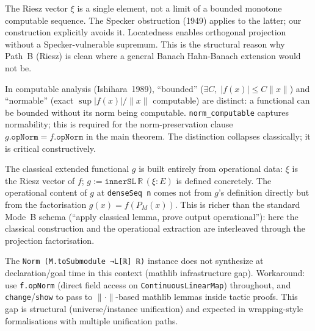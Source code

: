 \begin{remark}
\label{rem:audit_obs4}
\leanok
{}
The Riesz vector $\xi$ is a single element, not a limit of a bounded
monotone computable sequence.  The Specker obstruction (1949) applies to
the latter; our construction explicitly avoids it.  Locatedness enables
orthogonal projection without a Specker-vulnerable supremum.  This is the
structural reason why Path~B (Riesz) is clean where a general Banach
Hahn-Banach extension would not be.
\end{remark}

\begin{remark}
\label{rem:audit_obs5}
\leanok
{}
In computable analysis (Ishihara~1989), ``bounded'' ($\exists C,\; |f(x)|
\le C\|x\|$) and ``normable'' (exact $\sup |f(x)|/\|x\|$ computable) are
distinct: a functional can be bounded without its norm being computable.
\texttt{norm\_computable} captures normability; this is required for the
norm-preservation clause $g.\texttt{opNorm} = f.\texttt{opNorm}$ in the
main theorem.  The distinction collapses classically; it is critical
constructively.
\end{remark}

\begin{remark}
\label{rem:audit_obs6}
\leanok
{}
The classical extended functional $g$ is built entirely from operational
data: $\xi$ is the Riesz vector of $f$; $g := \texttt{innerSL}\,
\mathbb{R}\,(\xi : E)$ is defined concretely.  The operational content
of $g$ at \texttt{denseSeq n} comes not from $g$'s definition directly
but from the factorisation $g(x) = f(P_M(x))$.  This is richer than
the standard Mode~B schema (``apply classical lemma, prove output
operational''): here the classical construction and the operational
extraction are interleaved through the projection factorisation.
\end{remark}

\begin{remark}
\label{rem:audit_obs7}
\leanok
The \texttt{Norm (M.toSubmodule →L[ℝ] ℝ)} instance does not synthesize
at declaration/goal time in this context (mathlib infrastructure gap).
Workaround: use \texttt{f.opNorm} (direct field access on
\texttt{ContinuousLinearMap}) throughout, and \texttt{change}/\texttt{show}
to pass to $\|\cdot\|$-based mathlib lemmas inside tactic proofs.  This
gap is structural (universe/instance unification) and expected in
wrapping-style formalisations with multiple unification paths.
\end{remark}

